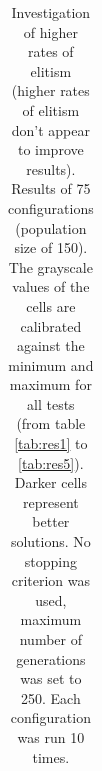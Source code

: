 \begin{table}[H]
\begin{tabular}{ccc|c|c|c|c|c}
\end{tabular}
\caption{Investigation of higher rates of elitism (higher rates of elitism don't appear to improve results). Results of 75 configurations (population size of 150). The grayscale values of the cells are calibrated against the minimum and maximum for all tests (from table \ref{tab:res1} to \ref{tab:res5}). Darker cells represent better solutions. No stopping criterion was used, maximum number of generations was set to 250. Each configuration was run 10 times.}
\label{tab:res4}
\end{table}


